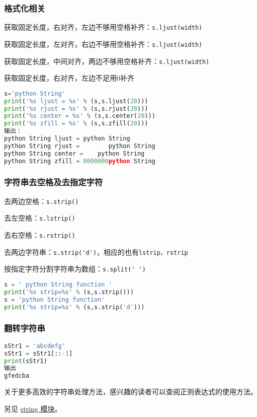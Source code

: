 \subsubsection{格式化相关}
获取固定长度，右对齐，左边不够用空格补齐：\verb`s.ljust(width)`

获取固定长度，左对齐，右边不够用空格补齐：\verb`s.ljust(width)`

获取固定长度，中间对齐，两边不够用空格补齐：\verb`s.ljust(width)`

获取固定长度，右对齐，左边不足用0补齐

\begin{lstlisting}[language=python]
s='python String'
print('%s ljust = %s' % (s,s.ljust(20)))
print('%s rjust = %s' % (s,s.rjust(20)))
print('%s center = %s' % (s,s.center(20)))
print('%s zfill = %s' % (s,s.zfill(20)))
输出：
python String ljust = python String       
python String rjust =        python String
python String center =    python String    
python String zfill = 0000000python String
\end{lstlisting}

\subsubsection{字符串去空格及去指定字符}

去两边空格：\verb`s.strip()`

去左空格：\verb`s.lstrip()`

去右空格：\verb`s.rstrip()`

去两边字符串：\verb`s.strip('d')`，相应的也有\verb`lstrip，rstrip`

按指定字符分割字符串为数组：\verb`s.split(' ')`

\begin{lstlisting}[language=python]
s = ' python String function '
print('%s strip=%s' % (s,s.strip()))
s = 'python String function'
print('%s strip=%s' % (s,s.strip('d')))
\end{lstlisting}

\subsubsection{翻转字符串}
\begin{lstlisting}[language=python]
sStr1 = 'abcdefg'
sStr1 = sStr1[::-1]
print(sStr1)
输出
gfedcba
\end{lstlisting}

关于更多高效的字符串处理方法，感兴趣的读者可以查阅正则表达式的使用方法。

另见 \href{https://docs.python.org/3/library/string.html}{string 模块}。
